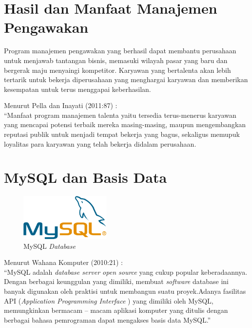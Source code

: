 \section{Hasil dan Manfaat Manajemen Pengawakan}

Program manajemen pengawakan yang berhasil dapat membantu perusahaan untuk menjawab tantangan bisnis, memasuki wilayah pasar yang baru dan bergerak maju menyaingi kompetitor. Karyawan yang bertalenta akan lebih tertarik untuk bekerja diperusahaan yang menghargai karyawan dan memberikan kesempatan untuk terus menggapai keberhasilan.

Menurut Pella dan Inayati (2011:87) \cite{4} : \\
“Manfaat program manajemen talenta yaitu tersedia terus-menerus karyawan yang mencapai potensi terbaik mereka masing-masing, maupun mengembangkan reputasi publik untuk menjadi tempat bekerja yang bagus, sekaligus memupuk loyalitas para karyawan yang telah bekerja didalam perusahaan.

\newpage

\section{MySQL dan Basis Data}

\begin{figure}
	\centering
	\includegraphics[width=0.4\textwidth]
	{pics/mysql.png}
	\caption{MySQL \textit{Database}}
	\label{fig:31}
\end{figure}

Menurut Wahana Komputer (2010:21) : \\
“MySQL adalah \textit{database server open source} yang cukup popular keberadaannya. Dengan berbagai keunggulan yang dimiliki, membuat \textit{software} database ini banyak digunakan oleh praktisi untuk membangun suatu proyek.Adanya fasilitas API (\textit{Application Programming Interface} ) yang dimiliki oleh MySQL, memungkinkan bermacam – macam aplikasi komputer yang ditulis dengan berbagai bahasa pemrograman dapat mengakses basis data MySQL.” \\

